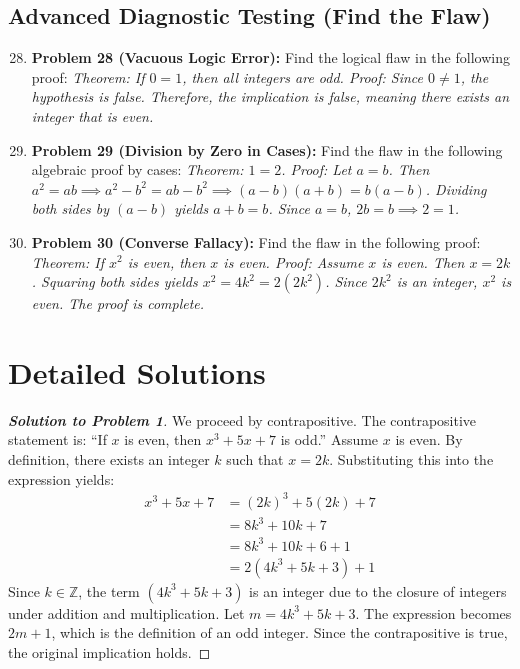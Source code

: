 \documentclass[11pt]{article}
\begin{document}
\subsection{Advanced Diagnostic Testing (Find the Flaw)}
\begin{enumerate}
    \setcounter{enumi}{27}
    \item \textbf{Problem 28 (Vacuous Logic Error):} Find the logical flaw in the following proof: \textit{Theorem: If $0 = 1$, then all integers are odd. Proof: Since $0 \neq 1$, the hypothesis is false. Therefore, the implication is false, meaning there exists an integer that is even.}
    \item \textbf{Problem 29 (Division by Zero in Cases):} Find the flaw in the following algebraic proof by cases: \textit{Theorem: $1 = 2$. Proof: Let $a = b$. Then $a^2 = ab \implies a^2 - b^2 = ab - b^2 \implies (a-b)(a+b) = b(a-b)$. Dividing both sides by $(a-b)$ yields $a+b = b$. Since $a=b$, $2b = b \implies 2 = 1$.}
    \item \textbf{Problem 30 (Converse Fallacy):} Find the flaw in the following proof: \textit{Theorem: If $x^2$ is even, then $x$ is even. Proof: Assume $x$ is even. Then $x = 2k$. Squaring both sides yields $x^2 = 4k^2 = 2(2k^2)$. Since $2k^2$ is an integer, $x^2$ is even. The proof is complete.}
\end{enumerate}

\newpage

\section{Detailed Solutions}
\label{sec:solutions}

\begin{proof}[\textbf{Solution to Problem 1}]
We proceed by contrapositive. The contrapositive statement is: ``If $x$ is even, then $x^3 + 5x + 7$ is odd.''
Assume $x$ is even. By definition, there exists an integer $k$ such that $x = 2k$. Substituting this into the expression yields:
\begin{align*}
x^3 + 5x + 7 &= (2k)^3 + 5(2k) + 7 \\
&= 8k^3 + 10k + 7 \\
&= 8k^3 + 10k + 6 + 1 \\
&= 2(4k^3 + 5k + 3) + 1
\end{align*}
Since $k \in \mathbb{Z}$, the term $(4k^3 + 5k + 3)$ is an integer due to the closure of integers under addition and multiplication. Let $m = 4k^3 + 5k + 3$. The expression becomes $2m + 1$, which is the definition of an odd integer. Since the contrapositive is true, the original implication holds.
\end{proof}
\end{document}
